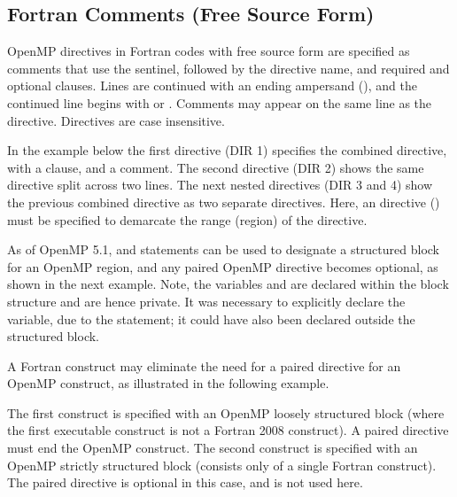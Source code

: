 \begin{fortranspecific}[4ex]
\section{Fortran Comments (Free Source Form)}
\label{sec:fortran_free_format_comments}

OpenMP directives in Fortran codes with free source form are specified as comments
that use the  sentinel, followed by the
directive name, and required and optional clauses.  Lines are continued with an ending ampersand (\scode{&}),
and the continued line begins with  or . Comments may appear on the
same line as the directive.  Directives are case insensitive.

In the example below the first directive (DIR 1) specifies the %
 combined directive, with a  clause, and a comment.
The second directive (DIR 2) shows the same directive split across two lines. 
The next nested directives (DIR 3 and 4) show the previous combined directive as
two separate directives. 
Here, an  directive () must be specified to demarcate the range (region)
of the  directive. 

\clearpage

As of OpenMP 5.1,  and  statements can be used to designate 
a structured block for an OpenMP region, and any paired OpenMP  directive becomes optional,
as shown in the next example.  Note, the variables  and  are declared within the 
block structure and are hence private.
It was necessary to explicitly declare the  variable, due to the  statement; 
it could have also been declared outside the structured block.


A Fortran  construct may eliminate the need for a paired  directive for an OpenMP construct, 
as illustrated in the following example.

The first  construct is specified with an OpenMP loosely structured block 
(where the first executable construct is not a Fortran 2008  construct). 
A paired  directive must end the OpenMP construct.
The second  construct is specified with an OpenMP strictly structured block 
(consists only of a single Fortran  construct). 
The paired  directive is optional in this case, and is not used here.


\end{fortranspecific}
